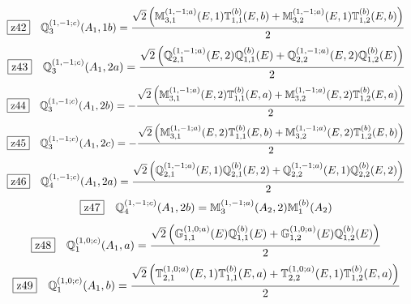 \documentclass[fleqn,10pt,landscape]{jsarticle}
\begin{document}
\begin{dmath*}
\hspace*{3mm}\fbox{z42}\quad \mathbb{Q}_{3}^{(1,-1;c)}(A_{1},1b)=\frac{\sqrt{2} \left(\mathbb{M}_{3,1}^{(1,-1;a)}(E,1) \mathbb{T}_{1,1}^{(b)}(E,b) + \mathbb{M}_{3,2}^{(1,-1;a)}(E,1) \mathbb{T}_{1,2}^{(b)}(E,b)\right)}{2}
\end{dmath*}
\begin{dmath*}
\hspace*{3mm}\fbox{z43}\quad \mathbb{Q}_{3}^{(1,-1;c)}(A_{1},2a)=\frac{\sqrt{2} \left(\mathbb{Q}_{2,1}^{(1,-1;a)}(E,2) \mathbb{Q}_{1,1}^{(b)}(E) + \mathbb{Q}_{2,2}^{(1,-1;a)}(E,2) \mathbb{Q}_{1,2}^{(b)}(E)\right)}{2}
\end{dmath*}
\begin{dmath*}
\hspace*{3mm}\fbox{z44}\quad \mathbb{Q}_{3}^{(1,-1;c)}(A_{1},2b)=- \frac{\sqrt{2} \left(\mathbb{M}_{3,1}^{(1,-1;a)}(E,2) \mathbb{T}_{1,1}^{(b)}(E,a) + \mathbb{M}_{3,2}^{(1,-1;a)}(E,2) \mathbb{T}_{1,2}^{(b)}(E,a)\right)}{2}
\end{dmath*}
\begin{dmath*}
\hspace*{3mm}\fbox{z45}\quad \mathbb{Q}_{3}^{(1,-1;c)}(A_{1},2c)=- \frac{\sqrt{2} \left(\mathbb{M}_{3,1}^{(1,-1;a)}(E,2) \mathbb{T}_{1,1}^{(b)}(E,b) + \mathbb{M}_{3,2}^{(1,-1;a)}(E,2) \mathbb{T}_{1,2}^{(b)}(E,b)\right)}{2}
\end{dmath*}
\begin{dmath*}
\hspace*{3mm}\fbox{z46}\quad \mathbb{Q}_{4}^{(1,-1;c)}(A_{1},2a)=\frac{\sqrt{2} \left(\mathbb{Q}_{2,1}^{(1,-1;a)}(E,1) \mathbb{Q}_{2,1}^{(b)}(E,2) + \mathbb{Q}_{2,2}^{(1,-1;a)}(E,1) \mathbb{Q}_{2,2}^{(b)}(E,2)\right)}{2}
\end{dmath*}
\begin{dmath*}
\hspace*{3mm}\fbox{z47}\quad \mathbb{Q}_{4}^{(1,-1;c)}(A_{1},2b)=\mathbb{M}_{3}^{(1,-1;a)}(A_{2},2) \mathbb{M}_{1}^{(b)}(A_{2})
\end{dmath*}
\begin{dmath*}
\hspace*{3mm}\fbox{z48}\quad \mathbb{Q}_{1}^{(1,0;c)}(A_{1},a)=\frac{\sqrt{2} \left(\mathbb{G}_{1,1}^{(1,0;a)}(E) \mathbb{Q}_{1,1}^{(b)}(E) + \mathbb{G}_{1,2}^{(1,0;a)}(E) \mathbb{Q}_{1,2}^{(b)}(E)\right)}{2}
\end{dmath*}
\begin{dmath*}
\hspace*{3mm}\fbox{z49}\quad \mathbb{Q}_{1}^{(1,0;c)}(A_{1},b)=\frac{\sqrt{2} \left(\mathbb{T}_{2,1}^{(1,0;a)}(E,1) \mathbb{T}_{1,1}^{(b)}(E,a) + \mathbb{T}_{2,2}^{(1,0;a)}(E,1) \mathbb{T}_{1,2}^{(b)}(E,a)\right)}{2}
\end{dmath*}
\end{document}
